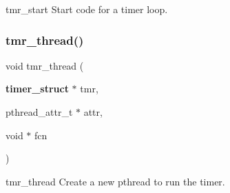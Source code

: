 tmr\+\_\+start Start code for a timer loop. \mbox{\label{timer_8c_a5e2ddc8c18fce17548fb74a99d25be03}} 
\subsubsection{tmr\+\_\+thread()}
{\footnotesize\ttfamily void tmr\+\_\+thread (\begin{DoxyParamCaption}\item[{\textbf{ timer\+\_\+struct} $\ast$}]{tmr,  }\item[{pthread\+\_\+attr\+\_\+t $\ast$}]{attr,  }\item[{void $\ast$}]{fcn }\end{DoxyParamCaption})}

tmr\+\_\+thread Create a new pthread to run the timer. 